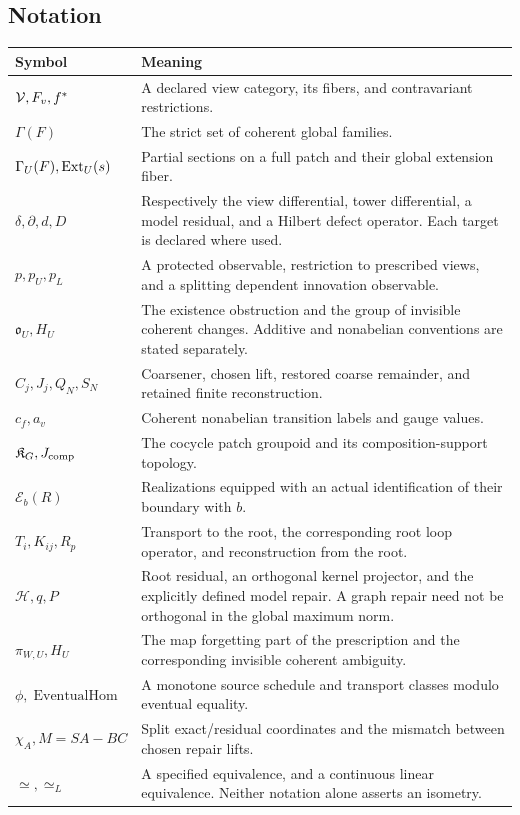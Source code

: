 \label{app:concordance}
\subsection{Notation}
\begin{longtable}{@{}p{.25\linewidth}p{.7\linewidth}@{}}
\toprule
Symbol & Meaning\\\midrule\endhead
\(\mathcal V,F_v,f^*\) & A declared view category, its fibers, and contravariant restrictions.\\
\(\Gamma(F)\) & The strict set of coherent global families.\\
\(\Gamma_U(F),\operatorname{Ext}_U(s)\) & Partial sections on a full patch and their global extension fiber.\\
\(\delta,\partial,d,D\) & Respectively the view differential, tower differential, a model residual, and a Hilbert defect operator. Each target is declared where used.\\
\(p,p_U,p_L\) & A protected observable, restriction to prescribed views, and a splitting dependent innovation observable.\\
\(\mathfrak o_U,H_U\) & The existence obstruction and the group of invisible coherent changes. Additive and nonabelian conventions are stated separately.\\
\(C_j,J_j,Q_N,S_N\) & Coarsener, chosen lift, restored coarse remainder, and retained finite reconstruction.\\
\(c_f,a_v\) & Coherent nonabelian transition labels and gauge values.\\
\(\mathfrak K_G,J_{\rm comp}\) & The cocycle patch groupoid and its composition-support topology.\\
\(\mathcal E_b(R)\) & Realizations equipped with an actual identification of their boundary with \(b\).\\
\(T_i,K_{ij},R_p\) & Transport to the root, the corresponding root loop operator, and reconstruction from the root.\\
\(\mathcal H,q,P\) & Root residual, an orthogonal kernel projector, and the explicitly defined model repair. A graph repair need not be orthogonal in the global maximum norm.\\
\(\pi_{W,U},H_U\) & The map forgetting part of the prescription and the corresponding invisible coherent ambiguity.\\
\(\phi,\operatorname{EventualHom}\) & A monotone source schedule and transport classes modulo eventual equality.\\
\(\chi_A,M=SA-BC\) & Split exact/residual coordinates and the mismatch between chosen repair lifts.\\
\(\simeq,\simeq_L\) & A specified equivalence, and a continuous linear equivalence. Neither notation alone asserts an isometry.\\
\bottomrule
\end{longtable}


